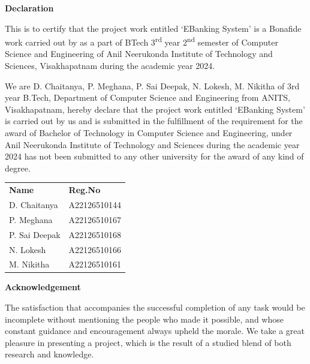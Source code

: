 \thispagestyle{empty}
\begin{center}
  {\huge\bfseries{} Declaration\par}
\end{center}
\vspace{1cm}

This is to certify that the project work entitled `E\-Banking System' is a
Bonafide work carried out by as a part of BTech 3\textsuperscript{rd} year
2\textsuperscript{nd} semester of Computer Science and Engineering of Anil
Neerukonda Institute of Technology and Sciences, Visakhapatnam during the
academic year 2024.

We are D. Chaitanya, P. Meghana, P. Sai Deepak, N. Lokesh, M. Nikitha of 3rd
year B.Tech, Department of Computer Science and Engineering from ANITS,
Visakhapatnam, hereby declare that the project work entitled `E\-Banking System'
is carried out by us and is submitted in the fulfillment of the requirement for
the award of Bachelor of Technology in Computer Science and Engineering, under
Anil Neerukonda Institute of Technology and Sciences during the academic year
2024 has not been submitted to any other university for the award of any
kind of degree.

\vspace{2cm}
\begin{tabular}{ll}
  \textbf{Name} & \textbf{Reg.No} \\
  D. Chaitanya & A22126510144 \\
  P. Meghana & A22126510167 \\
  P. Sai Deepak & A22126510168 \\
  N. Lokesh & A22126510166 \\
  M. Nikitha & A22126510161 \\
\end{tabular}
\newpage{}

\thispagestyle{empty}
\begin{center}
  {\huge\bfseries{} Acknowledgement\par}
\end{center}
\vspace{1cm}

The satisfaction that accompanies the successful completion of any task would
be incomplete without mentioning the people who made it possible, and whose
constant guidance and encouragement always upheld the morale. We take a great
pleasure in presenting a project, which is the result of a studied blend of
both research and knowledge.

